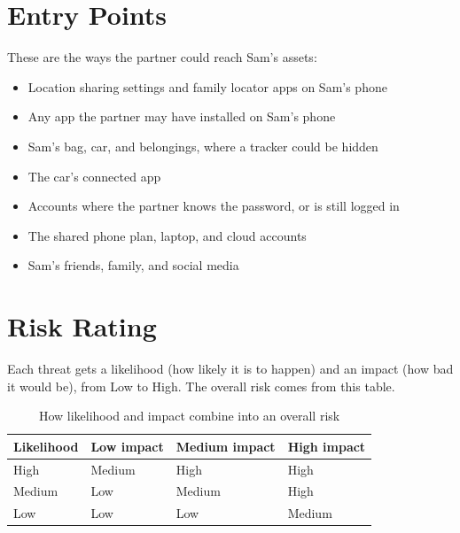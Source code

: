 \documentclass[11pt]{article}
\begin{document}
\section{Entry Points}
These are the ways the partner could reach Sam's assets:
\begin{itemize}
    \item Location sharing settings and family locator apps on Sam's phone
    \item Any app the partner may have installed on Sam's phone
    \item Sam's bag, car, and belongings, where a tracker could be hidden
    \item The car's connected app
    \item Accounts where the partner knows the password, or is still logged in
    \item The shared phone plan, laptop, and cloud accounts
    \item Sam's friends, family, and social media
\end{itemize}

\section{Risk Rating}
Each threat gets a likelihood (how likely it is to happen) and an impact (how bad it would be), from Low to High. The overall risk comes from this table.
\begin{table}[H]
\caption{How likelihood and impact combine into an overall risk}
\begin{tabular}{|m{}|m{}|m{}|m{}|}
\hline
\textbf{Likelihood} & \textbf{Low impact} & \textbf{Medium impact} & \textbf{High impact} \\
\hline
High & Medium & High & High \\
\hline
Medium & Low & Medium & High \\
\hline
Low & Low & Low & Medium
\end{tabular}
\end{table}
\end{document}

